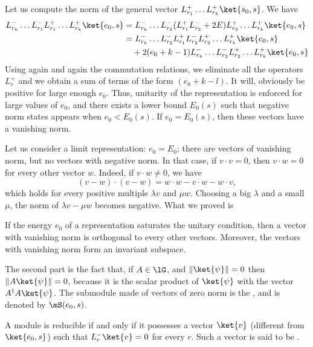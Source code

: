 Let us compute the norm of the general vector $L^+_{r_1}\ldots L^+_{r_k}\ket{s_0,s}$. We have
\begin{equation}
	\begin{aligned}[]
		L^-_{r_k}\ldots L^-_{r_1}L^+_{r_1}\ldots L^+_{r_k}\ket{e_0,s}	
				&= L^-_{r_k}\ldots L^-_{r_2} (L^+_{r_1}L^-_{r_2}+2E) L^+_{r_2}\ldots L^+_{r_k}\ket{e_0,s}\\
				&= L^-_{r_k}\ldots L^-_{r_2}L^+_{r_1}L^-_{r_2}L^+_{r_2}\ldots L^+_{r_k}\ket{e_0,s}\\
				&\quad +2(e_0+k-1)L^-_{r_k}\ldots L^-_{r_2} L^+_{r_2}\ldots L^+_{r_k}\ket{e_0,s}
	\end{aligned}
\end{equation}
Using again and again the commutation relations, we eliminate all the operators $L^+_r$ and we obtain a sum of terms of the form $(e_0+k-l)$. It will, obviously be positive for large enough $e_0$. Thus, unitarity of the representation is enforced for large values of $e_0$, and there exists a lower bound $E_0(s)$ such that negative norm states appears when $e_0<E_0(s)$. If $e_0=E_0(s)$, then these vectors have a vanishing norm.

Let us consider a limit representation: $e_0=E_0$; there are vectors of vanishing norm, but no vectors with negative norm. In that case, if $v\cdot v=0$, then $v\cdot w=0$ for every other vector $w$. Indeed, if $v\cdot w\neq 0$, we have
\begin{equation}
	(v-w)\cdot(v-w)=w\cdot w - v\cdot w-w\cdot v,
\end{equation}
which holds for every positive multiple $\lambda v$ and $\mu w$. Choosing a big $\lambda$ and a small $\mu$, the norm of $\lambda v-\mu w$ becomes negative. What we proved is
\begin{lemma}
	If the energy $e_0$ of a representation saturates the unitary condition, then a vector with vanishing norm is orthogonal to every other vectors. Moreover, the vectors with vanishing norm form an invariant subspace.
\end{lemma}
The second part is the fact that, if $A\in\lG$, and $\| \ket{\psi} \|=0$  then $\| A\ket{\psi} \|=0$, because it is the scalar product of $\ket{\psi}$ with the vector $A^{\dag}A\ket{\psi}$. The submodule made of vectors of zero norm is the , and is denoted by $\mS(e_0,s)$.

\begin{proposition}		\label{PropSinModRedSSIADesNuls}
A module is reducible if and only if it possesses a vector $\ket{v}$ (different from $\ket{e_0,s}$) such that $L^-_r\ket{v}=0$ for every $r$. Such a vector is said to be .
\end{proposition}

